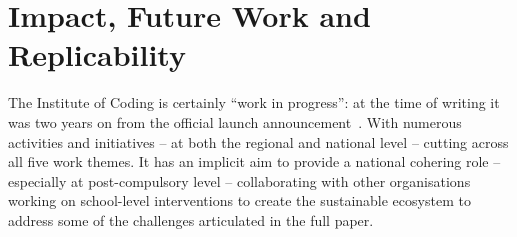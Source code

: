 \documentclass[conference]{IEEEtran}
\begin{document}





\section{Impact, Future Work and Replicability}\label{concl}

The Institute of Coding is certainly ``work in progress'': at the time
of writing it was two years on from the official launch
announcement~\cite{davenport-et-al:cep2019}.  With numerous activities
and initiatives -- at both the regional and national level -- cutting
across all five work themes. It has an implicit aim to provide a
national cohering role -- especially at post-compulsory level --
collaborating with other organisations working on school-level
interventions to create the sustainable ecosystem to address some of
the challenges articulated in the full paper.
\end{document}
